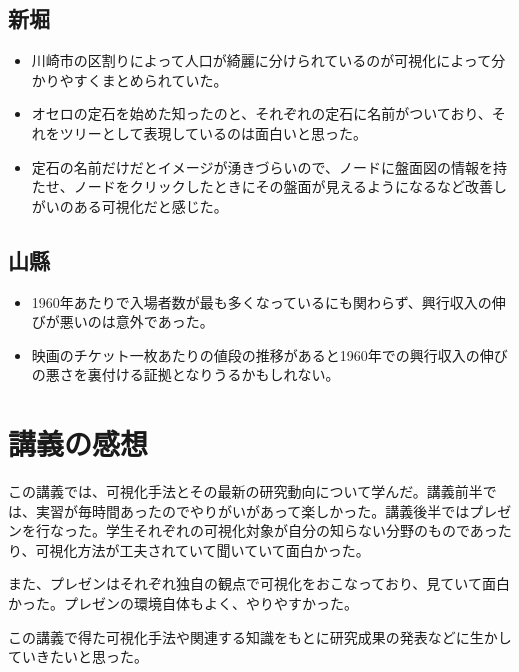 \documentclass{jsarticle}
\begin{document}
\subsection*{新堀}
\begin{itemize}
    \item 川崎市の区割りによって人口が綺麗に分けられているのが可視化によって分かりやすくまとめられていた。
    \item オセロの定石を始めた知ったのと、それぞれの定石に名前がついており、それをツリーとして表現しているのは面白いと思った。
    \item 定石の名前だけだとイメージが湧きづらいので、ノードに盤面図の情報を持たせ、ノードをクリックしたときにその盤面が見えるようになるなど改善しがいのある可視化だと感じた。
\end{itemize}
\subsection*{山縣}
\begin{itemize}
    \item 1960年あたりで入場者数が最も多くなっているにも関わらず、興行収入の伸びが悪いのは意外であった。
    \item 映画のチケット一枚あたりの値段の推移があると1960年での興行収入の伸びの悪さを裏付ける証拠となりうるかもしれない。
\end{itemize}
\section{講義の感想}
この講義では、可視化手法とその最新の研究動向について学んだ。講義前半では、実習が毎時間あったのでやりがいがあって楽しかった。講義後半ではプレゼンを行なった。学生それぞれの可視化対象が自分の知らない分野のものであったり、可視化方法が工夫されていて聞いていて面白かった。
\par また、プレゼンはそれぞれ独自の観点で可視化をおこなっており、見ていて面白かった。プレゼンの環境自体もよく、やりやすかった。
\par この講義で得た可視化手法や関連する知識をもとに研究成果の発表などに生かしていきたいと思った。
\end{document}
